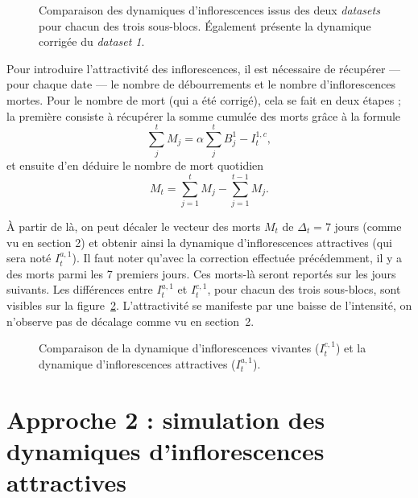 \documentclass[a4paper, 11pt]{article}
\begin{document}
\begin{figure}[ht]
 \centering
 \caption{Comparaison des dynamiques d'inflorescences issus des deux \textit{datasets} pour chacun des trois sous-blocs. Également présente la dynamique corrigée du \textit{dataset 1}.}
 \label{DS1}
\end{figure}




Pour introduire l'attractivité des inflorescences, il est nécessaire de récupérer --- pour chaque date --- le nombre de débourrements et le nombre d'inflorescences mortes. Pour le nombre de mort (qui a été corrigé), cela se fait en deux étapes ; la première consiste à récupérer la somme cumulée des morts grâce à la formule
$$\sum_j^t M_j = \alpha\sum_j^t B_j^1 - I_t^{1,c},$$
et ensuite d'en déduire le nombre de mort quotidien 
$$M_t = \sum_{j=1}^t M_j - \sum_{j=1}^{t-1} M_j.$$

À partir de là, on peut décaler le vecteur des morts $M_t$ de $\Delta_t =7$ jours (comme vu en section 2) et obtenir ainsi la dynamique d'inflorescences attractives (qui sera noté $I_t^{a, 1}$). Il faut noter qu'avec la correction effectuée précédemment, il y a des morts parmi les 7 premiers jours. Ces morts-là seront reportés sur les jours suivants.
Les différences entre $I_t^{a, 1}$ et $I_t^{c, 1}$, pour chacun des trois sous-blocs, sont visibles sur la figure~\ref{DS1A}. L'attractivité se manifeste par une baisse de l'intensité, on n'observe pas de décalage comme vu en section~2.

%  
% 

\begin{figure}[ht]
 \centering
 \caption{Comparaison de la dynamique d'inflorescences vivantes ($I_t^{c,1}$) et la dynamique d'inflorescences attractives ($I_t^{a,1}$).}
 \label{DS1A}
\end{figure}


\section{Approche 2 : simulation des dynamiques d'inflorescences attractives}
\end{document}

